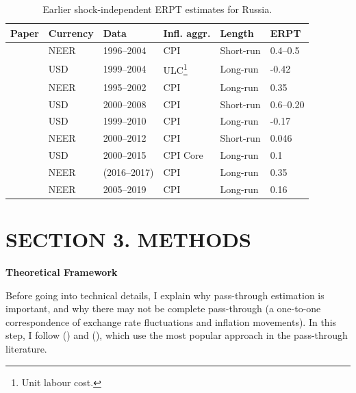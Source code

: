 \documentclass[12pt, a4paper]{extarticle}
\begin{document}
\begin{table}[b!]
	\centering
	\begin{tabular}{llllll}
		Paper                                   & Currency & Data         & Infl. aggr. & Length    & ERPT \\
		\hline
		\cite{Oomes2005}       & NEER               & 1996--2004   & CPI             & Short-run & 0.4--0.5     \\
		\cite{Korhonen2006} & USD & 1999--2004 & ULC\footnote{Unit labour cost.} & Long-run & -0.42 \\
		\cite{Dobrynskaya2008} & NEER               & 1995--2002   & CPI             & Long-run  & 0.35         \\
		\cite{Kataranova2010}  & USD                & 2000--2008   & CPI             & Short-run & 0.6--0.20    \\
		\cite{Beckmann2013}    & USD                & 1999--2010   & CPI             & Long-run  & -0.17        \\
		\cite{Ponomarev2016}   & NEER               & 2000--2012   & CPI             & Short-run & 0.046        \\
		\cite{Faryna2016}      & USD                & 2000--2015   & CPI Core        & Long-run  & 0.1          \\
		\cite{Sinyakov2019}    & NEER               & (2016--2017) & CPI             & Long-run  & 0.35         \\
		\cite{Khotulev2020}    & NEER               & 2005--2019   & CPI             & Long-run  & 0.16        \\
		\hline 
	\end{tabular}
	\caption{Earlier shock-independent ERPT estimates for Russia.}
	\label{table:litreview_erpt}
\end{table}

\clearpage
\section*{SECTION 3. METHODS}
\setcounter{section}{3}

\begin{center}
	\textbf{Theoretical Framework}
\end{center}

Before going into technical details, I explain why pass-through estimation is important, and why there may not be complete pass-through (a one-to-one correspondence of exchange rate fluctuations and inflation movements). In this step, I follow (\cite{Comunale2017}) and (\cite{Forbes2018}), which use the most popular approach in the pass-through literature.
\end{document}
